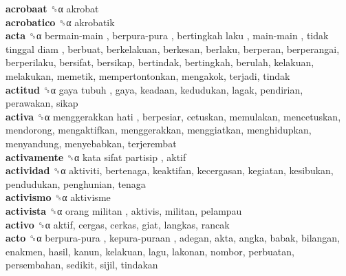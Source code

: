 \textbf{acrobaat} ␝α  akrobat  \\
\textbf{acrobatico} ␝α  akrobatik  \\
\textbf{acta} ␝α   bermain-main ,  berpura-pura ,  bertingkah laku ,  main-main ,  tidak tinggal diam , berbuat, berkelakuan, berkesan, berlaku, berperan, berperangai, berperilaku, bersifat, bersikap, bertindak, bertingkah, berulah, kelakuan, melakukan, memetik, mempertontonkan, mengakok, terjadi, tindak  \\
\textbf{actitud} ␝α   gaya tubuh , gaya, keadaan, kedudukan, lagak, pendirian, perawakan, sikap  \\
\textbf{activa} ␝α   menggerakkan hati , berpesiar, cetuskan, memulakan, mencetuskan, mendorong, mengaktifkan, menggerakkan, menggiatkan, menghidupkan, menyandung, menyebabkan, terjerembat  \\
\textbf{activamente} ␝α   kata sifat partisip , aktif  \\
\textbf{actividad} ␝α  aktiviti, bertenaga, keaktifan, kecergasan, kegiatan, kesibukan, pendudukan, penghunian, tenaga  \\
\textbf{activismo} ␝α  aktivisme  \\
\textbf{activista} ␝α   orang militan , aktivis, militan, pelampau  \\
\textbf{activo} ␝α  aktif, cergas, cerkas, giat, langkas, rancak  \\
\textbf{acto} ␝α   berpura-pura ,  kepura-puraan , adegan, akta, angka, babak, bilangan, enakmen, hasil, kanun, kelakuan, lagu, lakonan, nombor, perbuatan, persembahan, sedikit, sijil, tindakan  \\
